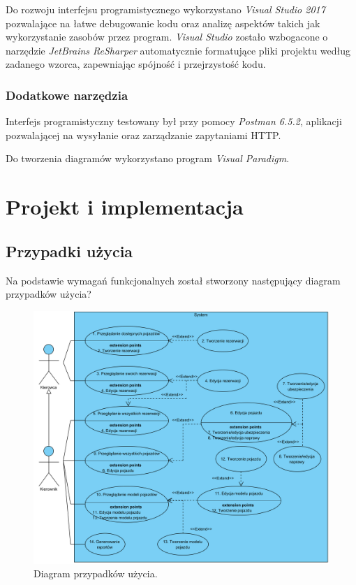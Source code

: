 \documentclass[eng,printmode,openany]{mgr}
\begin{document}
	Do rozwoju interfejsu programistycznego wykorzystano \textit{Visual Studio 2017} pozwalające na łatwe debugowanie kodu oraz analizę aspektów takich jak wykorzystanie zasobów przez program. \textit{Visual Studio} zostało wzbogacone o narzędzie \textit{JetBrains ReSharper} automatycznie formatujące pliki projektu według zadanego wzorca, zapewniając spójność i przejrzystość kodu.
	\subsection{Dodatkowe narzędzia}
	Interfejs programistyczny testowany był przy pomocy \textit{Postman 6.5.2}, aplikacji pozwalającej na wysyłanie oraz zarządzanie zapytaniami HTTP.
	
	Do tworzenia diagramów wykorzystano program \textit{Visual Paradigm}.
	
	\newpage
	\chapter{Projekt i implementacja}
	
	\newpage
	\section{Przypadki użycia}	
	Na podstawie wymagań funkcjonalnych został stworzony następujący diagram przypadków użycia?
	\begin{figure}[H]
		\centering
		\includegraphics[width=\textwidth]{images/use_case_1.png}
		\caption{Diagram przypadków użycia.}
	\end{figure}
\end{document}
